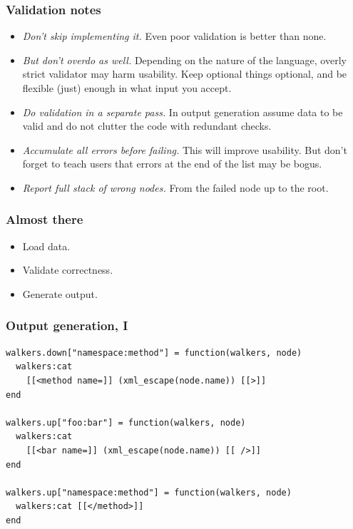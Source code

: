 \documentclass[handout]{beamer}
\begin{document}

\begin{frame}

\frametitle{Validation notes}

\begin{itemize}
\item \emph{Don't skip implementing it.} Even poor validation is better than none.
\pause
\item \emph{But don't overdo as well.} Depending on the nature of the language, overly strict validator may harm usability. Keep optional things optional, and be flexible (just) enough in what input you accept.
\pause
\item \emph{Do validation in a separate pass.} In output generation assume data to be valid and do not clutter the code with redundant checks.
\pause
\item \emph{Accumulate all errors before failing.} This will improve usability. But don't forget to teach users that errors at the end of the list may be bogus.
\item \emph{Report full stack of wrong nodes.} From the failed node up to the root.
\end{itemize}

\end{frame}


\begin{frame}

\frametitle{Almost there}

\begin{itemize}
\item[\checkmark] Load data.
\item[\checkmark] Validate correctness.
\item Generate output.
\end{itemize}

\end{frame}


\begin{frame}[fragile]

\frametitle{Output generation, I}

\begin{verbatim}
walkers.down["namespace:method"] = function(walkers, node)
  walkers:cat
    [[<method name=]] (xml_escape(node.name)) [[>]]
end

walkers.up["foo:bar"] = function(walkers, node)
  walkers:cat
    [[<bar name=]] (xml_escape(node.name)) [[ />]]
end

walkers.up["namespace:method"] = function(walkers, node)
  walkers:cat [[</method>]]
end
\end{verbatim}

\end{frame}
\end{document}
